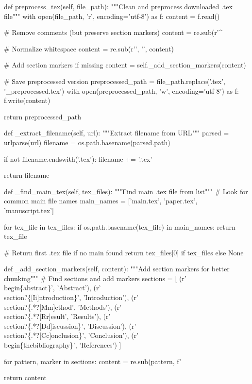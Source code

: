     def preprocess_tex(self, file_path):
        """Clean and preprocess downloaded .tex file"""
        with open(file_path, 'r', encoding='utf-8') as f:
            content = f.read()
        
        # Remove comments (but preserve section markers)
        content = re.sub(r'^%
        
        # Normalize whitespace
        content = re.sub(r'\n\s*\n\s*\n', '\n\n', content)
        
        # Add section markers if missing
        content = self._add_section_markers(content)
        
        # Save preprocessed version
        preprocessed_path = file_path.replace('.tex', '_preprocessed.tex')
        with open(preprocessed_path, 'w', encoding='utf-8') as f:
            f.write(content)
        
        return preprocessed_path
    
    def _extract_filename(self, url):
        """Extract filename from URL"""
        parsed = urlparse(url)
        filename = os.path.basename(parsed.path)
        
        if not filename.endswith('.tex'):
            filename += '.tex'
        
        return filename
    
    def _find_main_tex(self, tex_files):
        """Find main .tex file from list"""
        # Look for common main file names
        main_names = ['main.tex', 'paper.tex', 'manuscript.tex']
        
        for tex_file in tex_files:
            if os.path.basename(tex_file) in main_names:
                return tex_file
        
        # Return first .tex file if no main found
        return tex_files[0] if tex_files else None
    
    def _add_section_markers(self, content):
        """Add section markers for better chunking"""
        # Find sections and add markers
        sections = [
            (r'\\begin\{abstract\}', 'Abstract'),
            (r'\\section\*?\{[Ii]ntroduction\}', 'Introduction'),
            (r'\\section\*?\{.*?[Mm]ethod', 'Methods'),
            (r'\\section\*?\{.*?[Rr]esult', 'Results'),
            (r'\\section\*?\{.*?[Dd]iscussion\}', 'Discussion'),
            (r'\\section\*?\{.*?[Cc]onclusion\}', 'Conclusion'),
            (r'\\begin\{thebibliography\}', 'References')
        ]
        
        for pattern, marker in sections:
            content = re.sub(pattern, f'%
        
        return content